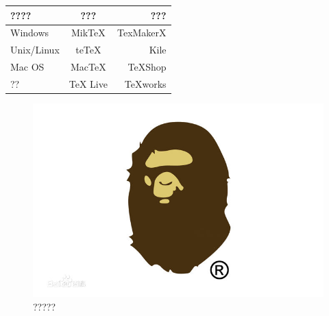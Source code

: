 \documentclass[UTF8]{article}
\begin{document}
\begin{tabular}{|l|c|r|}
 \hline
????& ???& ???\\
 \hline
Windows & MikTeX & TexMakerX \\
 \hline
Unix/Linux & teTeX & Kile \\
 \hline
Mac OS & MacTeX & TeXShop \\
 \hline
??& TeX Live & TeXworks \\
 \hline
\end{tabular}

\begin{figure}[htbp]
\centering
\includegraphics[width = .8\textwidth]{a.jpg}
\caption{?????}
\label{fig:myphoto}
\end{figure}
\end{document}
